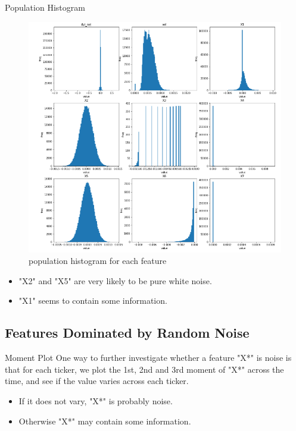 \documentclass{beamer}
\begin{document}
\begin{frame}{Population Histogram}
\begin{figure}[ht]
\centering
\includegraphics[scale=0.45]{pop_hist.PNG}
\caption{population histogram for each feature}
\label{fig:label}
\end{figure}

\begin{itemize}
    \item "X2" and "X5" are very likely to be pure white noise.
    \item "X1" seems to contain some information.
\end{itemize}
\end{frame}

\subsection{Features Dominated by Random Noise}
\begin{frame}{Moment Plot}
One way to further investigate whether a feature "X*" is noise is that for each ticker, we plot the 1st, 2nd and 3rd moment of "X*" across the time, and see if the value varies across each ticker.

\begin{itemize}
    \item If it does not vary, "X*" is probably noise.
    \item Otherwise "X*" may contain some information.
\end{itemize}
\end{frame}
\end{document}
